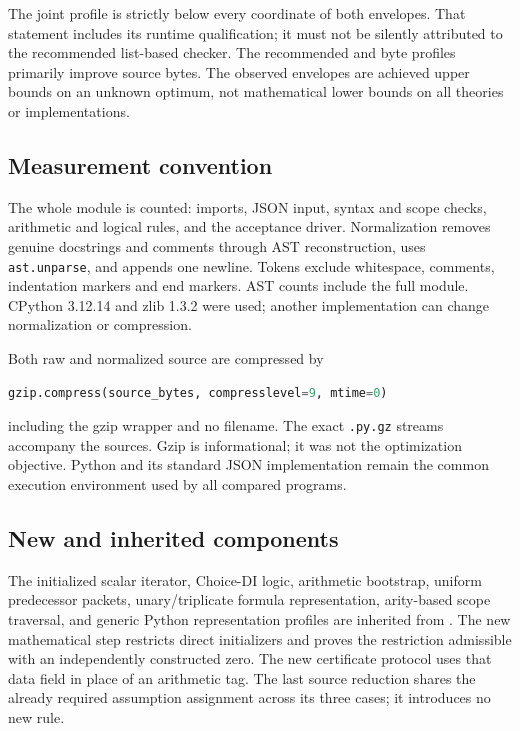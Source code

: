 \documentclass[11pt,letterpaper]{article}
\theoremstyle{definition}\newtheorem{definition}[theorem]{Definition}
\theoremstyle{remark}\newtheorem{remark}[theorem]{Remark}
\begin{document}
The joint profile is strictly below every coordinate of both envelopes.
That statement includes its runtime qualification; it must not be
silently attributed to the recommended list-based checker. The
recommended and byte profiles primarily improve source bytes. The
observed envelopes are achieved upper bounds on an unknown optimum,
not mathematical lower bounds on all theories or implementations.

\subsection{Measurement convention}

The whole module is counted: imports, JSON input, syntax and scope
checks, arithmetic and logical rules, and the acceptance driver.
Normalization removes genuine docstrings and comments through AST
reconstruction, uses \texttt{ast.unparse}, and appends one newline.
Tokens exclude whitespace, comments, indentation markers and end markers.
AST counts include the full module. CPython 3.12.14 and zlib 1.3.2 were
used; another implementation can change normalization or compression.

Both raw and normalized source are compressed by
\begin{lstlisting}[language=Python]
gzip.compress(source_bytes, compresslevel=9, mtime=0)
\end{lstlisting}
including the gzip wrapper and no filename. The exact \texttt{.py.gz}
streams accompany the sources. Gzip is informational; it was not the
optimization objective. Python and its standard JSON implementation
remain the common execution environment used by all compared programs.

\subsection{New and inherited components}

The initialized scalar iterator, Choice-DI logic, arithmetic bootstrap,
uniform predecessor packets, unary/triplicate formula representation,
arity-based scope traversal, and generic Python representation profiles
are inherited from \cite{arity,uniform,constructed,generated,transient}.
The new mathematical step restricts direct initializers and proves the
restriction admissible with an independently constructed zero. The new
certificate protocol uses that data field in place of an arithmetic tag.
The last source reduction shares the already required assumption
assignment across its three cases; it introduces no new rule.
\end{document}
